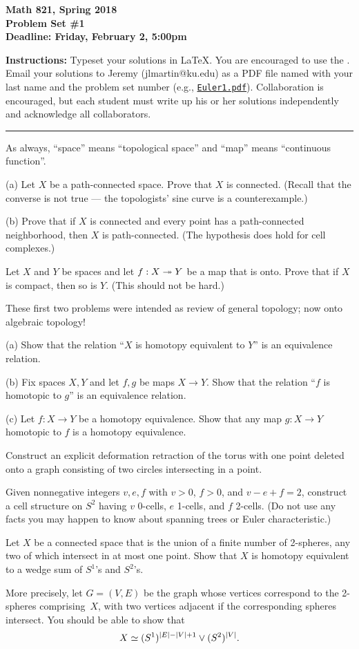 

\thispagestyle{empty}
{\bf Math 821, Spring 2018\\
Problem Set \#1\\
Deadline: Friday, February 2, 5:00pm}

\textbf{Instructions:} Typeset your solutions in LaTeX.  You are encouraged to use the . Email your solutions to Jeremy (jlmartin@ku.edu) as a PDF file named with your last name and the problem set number (e.g., \underline{\tt Euler1.pdf}).  Collaboration is encouraged, but each student must write up his or her solutions independently and acknowledge all collaborators.
\medskip
\hrule

As always, ``space'' means ``topological space'' and ``map'' means ``continuous function''.

\prob (a) Let $X$ be a path-connected space. Prove that $X$ is connected.  (Recall that the converse is not true --- the topologists' sine curve is a counterexample.)

(b) Prove that if $X$ is connected and every point has a path-connected neighborhood, then $X$ is path-connected.  (The hypothesis does hold for cell complexes.)

\prob Let $X$ and $Y$ be spaces and let $f:X\twoheadrightarrow Y$ be a map that is onto.  Prove that if $X$ is compact, then so is $Y$.  (This should not be hard.)

\bigskip
\bigskip
These first two problems were intended as review of general topology; now onto algebraic topology!
\bigskip

  (a) Show that the relation ``$X$ is homotopy equivalent to $Y$''
is an equivalence relation.

(b) Fix spaces $X,Y$ and let $f,g$ be maps $X\to Y$.  Show that the relation ``$f$ is homotopic to $g$'' is an equivalence relation.

(c) Let $f:X\to Y$ be a homotopy equivalence.  Show that any map $g:X\to Y$ homotopic to $f$ is a homotopy equivalence.

 Construct an explicit deformation retraction of the torus with one point deleted onto a graph consisting of two circles intersecting in a point.

 Given nonnegative integers $v,e,f$ with $v>0$, $f>0$, and $v-e+f=2$, construct a cell structure on $S^2$ having $v$ 0-cells, $e$ 1-cells, 
and $f$ 2-cells.  (Do not use any facts you may happen to know about spanning trees or Euler characteristic.)

Let $X$ be a connected space that is the union of a finite number of 2-spheres, any two of which intersect in at most one point.  Show that $X$ is homotopy equivalent to a wedge sum of $S^1$'s and $S^2$'s.

More precisely, let $G=(V,E)$ be the graph whose vertices correspond to the 2-spheres comprising~$X$, with two vertices adjacent if the corresponding spheres intersect.  You should be able to show that 
\[X\simeq(S^1)^{|E|-|V|+1}\vee(S^2)^{|V|}.\]


